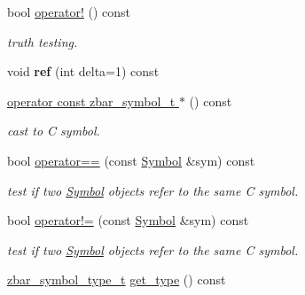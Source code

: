 \begin{DoxyCompactItemize}
\item 
\hypertarget{classzbar_1_1_symbol_a226419c7e45bc02299bece56bada00a0}{
bool \hyperlink{classzbar_1_1_symbol_a226419c7e45bc02299bece56bada00a0}{operator!} () const }
\label{classzbar_1_1_symbol_a226419c7e45bc02299bece56bada00a0}

\begin{DoxyCompactList}\small\item\em truth testing. \end{DoxyCompactList}\item 
\hypertarget{classzbar_1_1_symbol_ac1dc9ed7e3a9287447892d445d9deecf}{
void {\bfseries ref} (int delta=1) const }
\label{classzbar_1_1_symbol_ac1dc9ed7e3a9287447892d445d9deecf}

\item 
\hypertarget{classzbar_1_1_symbol_ab5f1f1cba13fd215cb65a9eb4816015a}{
\hyperlink{classzbar_1_1_symbol_ab5f1f1cba13fd215cb65a9eb4816015a}{operator const zbar\_\-symbol\_\-t $\ast$} () const }
\label{classzbar_1_1_symbol_ab5f1f1cba13fd215cb65a9eb4816015a}

\begin{DoxyCompactList}\small\item\em cast to C symbol. \end{DoxyCompactList}\item 
\hypertarget{classzbar_1_1_symbol_a20645c647a189b902be1b1abd7a51864}{
bool \hyperlink{classzbar_1_1_symbol_a20645c647a189b902be1b1abd7a51864}{operator==} (const \hyperlink{classzbar_1_1_symbol}{Symbol} \&sym) const }
\label{classzbar_1_1_symbol_a20645c647a189b902be1b1abd7a51864}

\begin{DoxyCompactList}\small\item\em test if two \hyperlink{classzbar_1_1_symbol}{Symbol} objects refer to the same C symbol. \end{DoxyCompactList}\item 
\hypertarget{classzbar_1_1_symbol_ad4dd4c113481aaa7857f7721e9e60df6}{
bool \hyperlink{classzbar_1_1_symbol_ad4dd4c113481aaa7857f7721e9e60df6}{operator!=} (const \hyperlink{classzbar_1_1_symbol}{Symbol} \&sym) const }
\label{classzbar_1_1_symbol_ad4dd4c113481aaa7857f7721e9e60df6}

\begin{DoxyCompactList}\small\item\em test if two \hyperlink{classzbar_1_1_symbol}{Symbol} objects refer to the same C symbol. \end{DoxyCompactList}\item 
\hypertarget{classzbar_1_1_symbol_a85e411dc15ca17b0fa3553e78aa705a6}{
\hyperlink{zbar_8h_a74c1318b082084bdeaa7333b355f3e64}{zbar\_\-symbol\_\-type\_\-t} \hyperlink{classzbar_1_1_symbol_a85e411dc15ca17b0fa3553e78aa705a6}{get\_\-type} () const }
\label{classzbar_1_1_symbol_a85e411dc15ca17b0fa3553e78aa705a6}


\end{DoxyCompactItemize}
